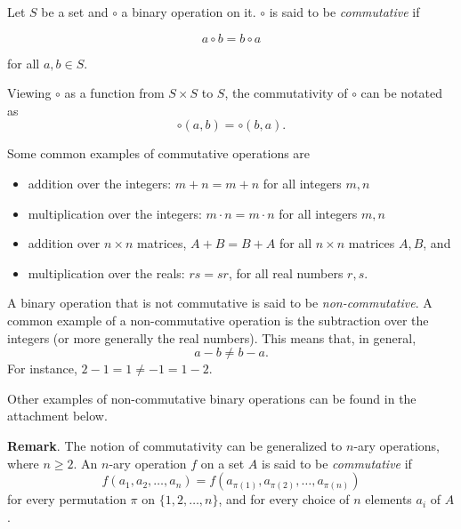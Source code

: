 \documentclass{article}
\begin{document}
Let $S$ be a set and $\circ$ a binary operation on it.  $\circ$ is said to be \emph{commutative} if

$$a \circ b = b \circ a$$

for all $a,b \in S$.

Viewing $\circ$ as a function from $S\times S$ to $S$, the commutativity of $\circ$ can be notated as $$\circ(a,b)=\circ(b,a).$$

Some common examples of commutative operations are 
\begin{itemize}
\item addition over the integers: $m+n=m+n$ for all integers $m,n$
\item multiplication over the integers: $m\cdot n=m\cdot n$ for all integers $m,n$
\item addition over $n \times n$ matrices, $A+B=B+A$ for all $n\times n$ matrices $A,B$, and
\item multiplication over the reals: $rs=sr$, for all real numbers $r,s$.
\end{itemize}

A binary operation that is not commutative is said to be \emph{non-commutative}.  A common example of a non-commutative operation is the subtraction over the integers (or more generally the real numbers).  This means that, in general, $$a-b\ne b-a.$$  For instance, $2-1=1\ne -1 = 1-2$.

Other examples of non-commutative binary operations can be found in the attachment below.

\textbf{Remark}.  The notion of commutativity can be generalized to $n$-ary operations, where $n\ge 2$.  An $n$-ary operation $f$ on a set $A$ is said to be \emph{commutative} if 
$$f(a_1,a_2,\ldots, a_n)=f(a_{\pi(1)},a_{\pi(2)},\ldots, a_{\pi(n)})$$ 
for every permutation $\pi$ on $\lbrace 1,2,\ldots, n\rbrace$, and for every choice of $n$ elements $a_i$ of $A$.
\end{document}
